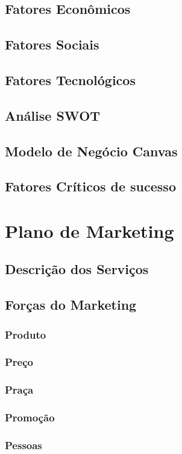 \documentclass[a4paper, 12pt]{paper}
\begin{document}
\subsection{Fatores Econômicos}
\subsection{Fatores Sociais}
\subsection{Fatores Tecnológicos}
\subsection{Análise SWOT}
\subsection{Modelo de Negócio Canvas}
\subsection{Fatores Críticos de sucesso}
\section{Plano de Marketing}
\subsection{Descrição dos Serviços}
\subsection{Forças do Marketing}
\subsubsection{Produto}
\subsubsection{Preço}
\subsubsection{Praça}
\subsubsection{Promoção}
\subsubsection{Pessoas}
\end{document}
